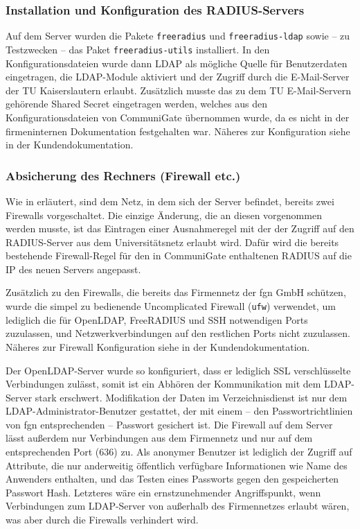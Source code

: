 \documentclass[11pt,a4paper,titlepage=firstiscover,headsepline,bibtotoc]{scrartcl} %
\begin{document}
\subsubsection{Installation und Konfiguration des RADIUS-Servers}\label{sec:RADIUS-Konf}
Auf dem Server wurden die Pakete \texttt{freeradius} und \texttt{freeradius-ldap} sowie -- zu Testzwecken -- das Paket \texttt{freeradius-utils} installiert. In den Konfigurationsdateien wurde dann LDAP als mögliche Quelle für Benutzerdaten eingetragen, die LDAP-Module aktiviert und der Zugriff durch die E-Mail-Server der TU Kaiserslautern erlaubt. Zusätzlich musste das zu dem TU E-Mail-Servern gehörende Shared Secret eingetragen werden, welches aus den Konfigurationsdateien von CommuniGate übernommen wurde, da es nicht in der firmeninternen Dokumentation festgehalten war. Näheres zur Konfiguration siehe  in der Kundendokumentation.

\subsubsection{Absicherung des Rechners (Firewall etc.)}
Wie in  erläutert, sind dem Netz, in dem sich der Server befindet, bereits zwei Firewalls vorgeschaltet. Die einzige Änderung, die an diesen vorgenommen werden musste, ist das Eintragen einer Ausnahmeregel mit der der Zugriff auf den RADIUS-Server aus dem Universitätsnetz erlaubt wird. Dafür wird die bereits bestehende Firewall-Regel für den in CommuniGate enthaltenen RADIUS auf die IP des neuen Servers angepasst.

Zusätzlich zu den Firewalls, die bereits das Firmennetz der fgn GmbH schützen, wurde die simpel zu bedienende Uncomplicated Firewall (\texttt{ufw}) verwendet, um lediglich die für OpenLDAP, FreeRADIUS und SSH notwendigen Ports zuzulassen, und Netzwerkverbindungen auf den restlichen Ports nicht zuzulassen. Näheres zur Firewall Konfiguration siehe  in der Kundendokumentation.

Der OpenLDAP-Server wurde so konfiguriert, dass er lediglich SSL verschlüsselte Verbindungen zulässt, somit ist ein Abhören der Kommunikation mit dem LDAP-Server stark erschwert. Modifikation der Daten im Verzeichnisdienst ist nur dem LDAP-Administrator-Benutzer gestattet, der mit einem -- den Passwortrichtlinien von fgn entsprechenden -- Passwort gesichert ist. Die Firewall auf dem Server lässt außerdem nur Verbindungen aus dem Firmennetz und nur auf dem entsprechenden Port (636) zu. Als anonymer Benutzer ist lediglich der Zugriff auf Attribute, die nur anderweitig öffentlich verfügbare Informationen wie Name des Anwenders enthalten, und das Testen eines Passworts gegen den gespeicherten Passwort Hash. Letzteres wäre ein ernstzunehmender Angriffspunkt, wenn Verbindungen zum LDAP-Server von außerhalb des Firmennetzes erlaubt wären, was aber durch die Firewalls verhindert wird.
\end{document}
